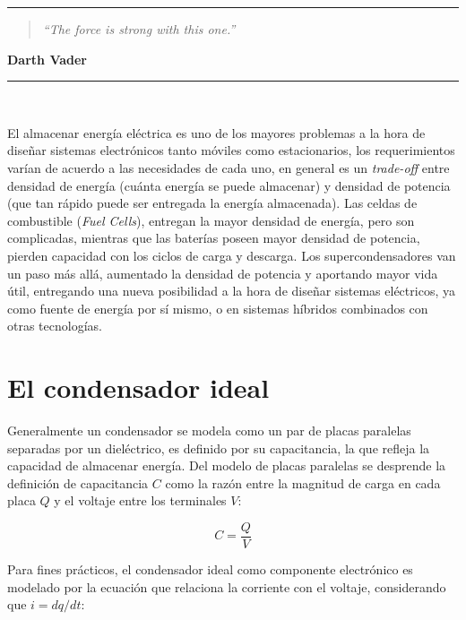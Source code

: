 \noindent
\rule{\linewidth}{1 pt}
\begin{flushright}
	\begin{quotation}
		\small{
			\textit{``The force is strong with this one.''}}
	\end{quotation}
	\bf{Darth Vader}
\end{flushright}
\noindent
\rule{\linewidth}{1 pt}\\
\vfill

El almacenar energía eléctrica es uno de los mayores problemas a la hora de diseñar sistemas electrónicos tanto móviles como estacionarios, los requerimientos varían de acuerdo a las necesidades de cada uno, en general es un \textit{trade-off} entre densidad de energía (cuánta energía se puede almacenar) y densidad de potencia (que tan rápido puede ser entregada la energía almacenada). Las celdas de combustible (\textit{Fuel Cells}), entregan la mayor densidad de energía, pero son complicadas, mientras que las baterías poseen mayor densidad de potencia, pierden capacidad con los ciclos de carga y descarga. Los supercondensadores van un paso más allá, aumentado la densidad de potencia y aportando mayor vida útil, entregando una nueva posibilidad a la hora de diseñar sistemas eléctricos, ya como fuente de energía por sí mismo, o en sistemas híbridos combinados con otras tecnologías\citep{Thounthong2009}.

\section{El condensador ideal}
Generalmente un condensador se modela como un par de placas paralelas separadas por un dieléctrico, es definido por su capacitancia, la que refleja la capacidad de almacenar energía. Del modelo de placas paralelas se desprende la definición de capacitancia $C$ como la razón entre la magnitud de carga en cada placa $Q$ y el voltaje entre los terminales $V$:

\begin{equation}
	C = \frac{Q}{V}
\end{equation}

Para fines prácticos, el condensador ideal como componente electrónico es modelado por la ecuación que relaciona la corriente con el voltaje, considerando que $i = dq/dt$:

